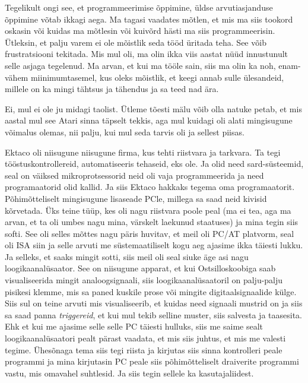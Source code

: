 
Tegelikult ongi see, et programmeerimise õppimine, üldse arvutiasjanduse 
õppimine võtab ikkagi aega. Ma tagasi vaadates mõtlen, et mis ma siis tookord 
oskasin või kuidas ma mõtlesin või  kuivõrd hästi ma siis programmeerisin.  
Ütleksin, et palju varem ei ole mõistlik seda tööd üritada teha. See võib  
frustratsiooni tekitada. Mis mul oli, ma olin ikka viis aastat nüüd innustunult 
selle asjaga tegelenud. Ma arvan, et kui ma  tööle sain, siis ma olin ka noh, 
enam-vähem miinimumtasemel, kus oleks  mõistlik, et keegi annab sulle 
ülesandeid, millele on ka mingi tähtsus ja tähendus ja sa teed nad  ära.


Ei, mul ei ole ju midagi taolist. Ütleme tõesti mälu võib olla natuke petab, et 
mis aastal mul see Atari sinna täpselt tekkis, aga mul kuidagi oli alati 
mingisugune võimalus olemas, nii palju, kui mul seda tarvis oli ja sellest 
piisas. 


Ektaco oli niisugune niisugune firma, kus tehti riistvara ja tarkvara. Ta tegi 
tööstuskontrollereid, automatiseeris tehaseid, eks ole. Ja olid need 
sard-süsteemid, seal on väiksed mikroprotsessorid neid oli vaja programmeerida 
ja need programaatorid olid kallid. Ja siis Ektaco hakkaks tegema oma 
programaatorit. Põhimõtteliselt mingisugune lisaseade PCle, millega sa saad 
neid kivisid kõrvetada. Üks teine tüüp, kes oli nagu riistvara poole peal (ma 
ei tea, aga ma arvan, et ta oli umbes nagu mina, värskelt laekunud staatuses) 
ja mina tegin siis softi. See oli selles mõttes nagu päris huvitav, et meil oli 
PC/AT platvorm, seal oli ISA siin ja selle arvuti me süstemaatiliselt kogu aeg 
ajasime ikka täiesti lukku. Ja selleks, et saaks mingit sotti, siis meil oli 
seal siuke äge asi nagu loogikaanalüsaator. See on niisugune apparat, et kui 
Ostsilloskoobiga saab visualiseerida mingit analoogsignaali, siis 
loogikaanalüsaatoril on palju-palju pisikesi klemme, mis sa paned kuskile prose 
või mingite digitaalsignaalide külge. Siis sul on teine arvuti mis  
visualiseerib, et kuidas need signaali mustrid on ja siis sa saad panna 
\emph{triggereid}, et kui mul tekib selline muster,  siis salvesta ja 
taasesita. Ehk et kui me ajasime selle selle PC täiesti hulluks, siis me saime 
sealt loogikaanalüsaatori pealt pärast vaadata, et mis siis juhtus, et mis me 
valesti tegime. Ühesõnaga tema siis tegi riista ja kirjutas siis sinna 
kontrolleri peale programmi ja mina kirjutasin PC peale siis põhimõtteliselt 
draiverite programmi vastu, mis omavahel suhtlesid. Ja siis tegin sellele ka 
kasutajaliidest.

